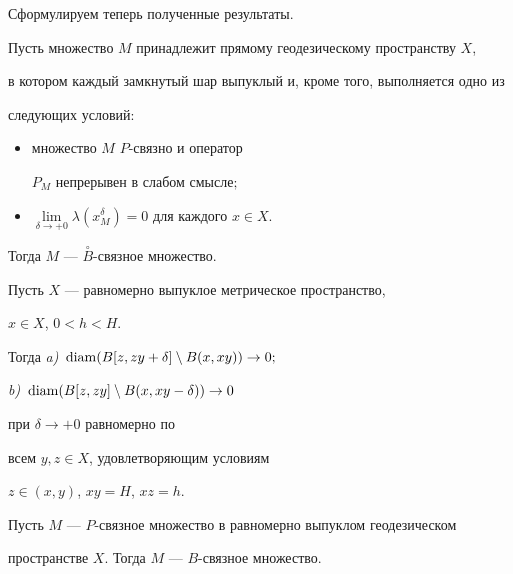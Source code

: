 Сформулируем теперь полученные результаты. 





\begin{thm}


Пусть множество $M$ принадлежит прямому геодезическому пространству $X$, 


в котором каждый замкнутый шар выпуклый и, кроме того, выполняется одно из


следующих условий\/$:$


\begin{itemize}


\item[a)] множество $M$\; $P$-связно и оператор


$P_{M}$ непрерывен в слабом смысле$;$


\item[b)] $\lim \limits_{\delta \to +0}


{\lambda (x_{M}^{ \delta})} = 0$ для каждого $x \in X$.


\end{itemize}


Тогда $M$ --- $\overset{\circ}{B}$-связное множество. 


\end{thm}





\begin{lem}


Пусть $X$ --- равномерно выпуклое метрическое пространство,


$x \in X$, $0 < h <H$.


Тогда {\em a)}~$\operatorname{diam}(B[z,zy + \delta]\setminus B(x,xy)) \to 0;$ 


{\em b)}~$\operatorname{diam}(B[z,zy]\setminus B(x,xy - \delta)) \to 0$


при $\delta \to +0$ равномерно по 


всем $y, z \in X$, удовлетворяющим условиям


$z \in (x,y)$, $xy = H$, $xz = h$.


\end{lem}





\begin{thm}


Пусть $M$ --- $P$-связное множество в равномерно выпуклом геодезическом 


пространстве $X$. Тогда $M$ --- $B$-связное множество.


\end{thm}





